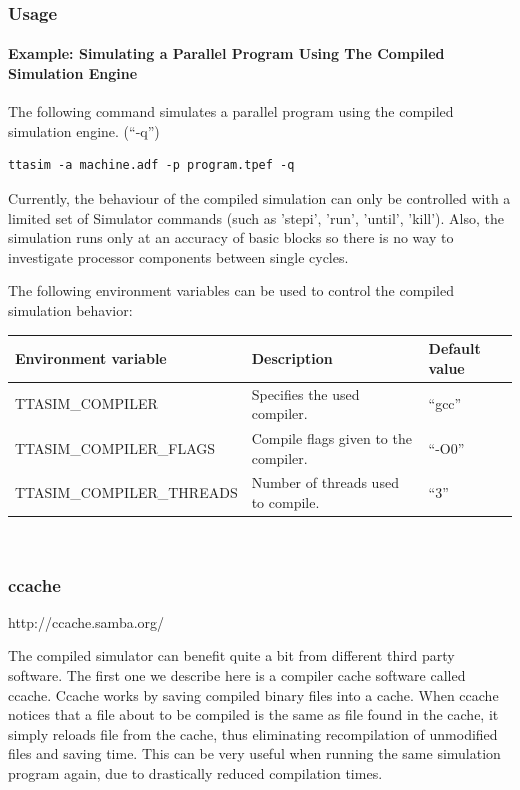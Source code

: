\documentclass[a4paper,twoside]{tceusermanual}
\begin{document}
\subsubsection{Usage}

\paragraph{Example: Simulating a Parallel Program Using The Compiled Simulation
Engine}

The following command simulates a parallel program using the compiled
simulation engine. (``-q'')

\begin{verbatim}
ttasim -a machine.adf -p program.tpef -q
\end{verbatim}

Currently, the behaviour of the compiled simulation can only be controlled with
a limited set of Simulator commands (such as 'stepi', 'run', 'until', 'kill').
Also, the simulation runs only at an accuracy of basic blocks so there 
is no way to investigate processor components between single cycles.

The following environment variables can be used to control the compiled
simulation behavior: \\

\begin{tabular}{p{}p{}
                p{}}
\textbf{Environment variable} &\textbf{Description} &\textbf{Default value} \\
\hline
TTASIM\_COMPILER & Specifies the used compiler. & ``gcc'' \\
TTASIM\_COMPILER\_FLAGS & Compile flags given to the compiler. & ``-O0'' \\
TTASIM\_COMPILER\_THREADS & Number of threads used to compile. & ``3'' \\

\end{tabular}\\


\subsubsection{ccache}
http://ccache.samba.org/

The compiled simulator can benefit quite a bit from different third party
software. The first one we describe here is a compiler cache software called
ccache. Ccache works by saving compiled binary files into a cache. When ccache
notices that a file about to be compiled is the same as file found in the
cache, it simply reloads file from the cache, thus eliminating recompilation
of unmodified files and saving time. This can be very useful when running the
same simulation program again, due to drastically reduced compilation times.
\end{document}
